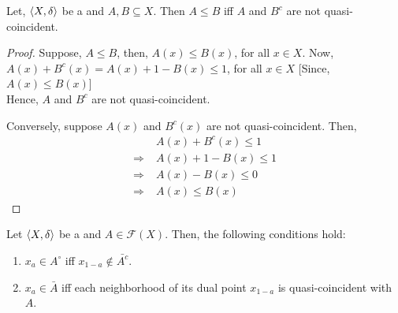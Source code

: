 \documentclass[../main-sheet.tex]{subfiles}
\begin{document}
\begin{prop}
    Let, \(\langle X, \delta \rangle\) be a \fts \s and \(A,B\subseteq X \). Then \(A\leq B \) iff \(A \) and \(B^c \) are not quasi-coincident.
\end{prop}
\begin{proof}
    Suppose, \(A\leq B \), then, \(A(x)\leq B(x )\), for all \(x\in X \).
    Now, \(A(x)+B^c(x)=A(x)+1-B(x)\leq 1 \), for all \(x\in X \) [Since, \(A(x)\leq B(x)\)]\\
    Hence, \(A \) and \(B^c \) are not quasi-coincident.

    Conversely, suppose \(A(x )\) and \(B^c(x )\) are not quasi-coincident. Then,
    \begin{align*}
        &A(x)+B^c(x)\leq 1\\
        \Rightarrow\;&A(x)+1-B(x)\leq 1\\
        \Rightarrow\;&A(x)-B(x)\leq 0\\
        \Rightarrow\;&A(x)\leq B(x)
    \end{align*}
\end{proof}
\begin{thm}
    Let \(\langle X, \delta \rangle \) be a \fts\s and \(A\in \mathcal{F}(X)\). Then, the following conditions hold:
    \begin{enumerate}
        \item \(x_a\in A^\circ\) iff \(x_{1-a }\not\in \bar{A^c}\).
        \item \(x_a\in \bar{A }\) iff each neighborhood of its dual point \(x_{1-a } \) is quasi-coincident with \(A\).
    \end{enumerate}
\end{thm}
\end{document}
